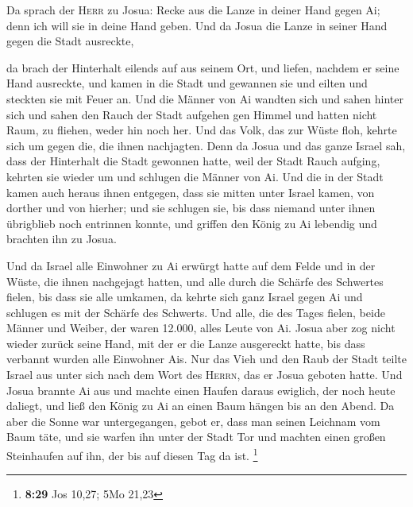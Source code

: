  Da sprach der \textsc{Herr} zu Josua: Recke aus die
Lanze in deiner Hand gegen Ai; denn ich will sie in deine Hand geben.
Und da Josua die Lanze in seiner Hand gegen die Stadt ausreckte,

 da brach der Hinterhalt eilends auf aus seinem Ort, und
liefen, nachdem er seine Hand ausreckte, und kamen in die Stadt und
gewannen sie und eilten und steckten sie mit Feuer an. 
Und die Männer von Ai wandten sich und sahen hinter sich und sahen den
Rauch der Stadt aufgehen gen Himmel und hatten nicht Raum, zu fliehen,
weder hin noch her. Und das Volk, das zur Wüste floh, kehrte sich um
gegen die, die ihnen nachjagten.  Denn da Josua und das
ganze Israel sah, dass der Hinterhalt die Stadt gewonnen hatte, weil der
Stadt Rauch aufging, kehrten sie wieder um und schlugen die Männer von
Ai.  Und die in der Stadt kamen auch heraus ihnen
entgegen, dass sie mitten unter Israel kamen, von dorther und von
hierher; und sie schlugen sie, bis dass niemand unter ihnen übrigblieb
noch entrinnen konnte,  und griffen den König zu Ai
lebendig und brachten ihn zu Josua.

 Und da Israel alle Einwohner zu Ai erwürgt hatte auf dem
Felde und in der Wüste, die ihnen nachgejagt hatten, und alle durch die
Schärfe des Schwertes fielen, bis dass sie alle umkamen, da kehrte sich
ganz Israel gegen Ai und schlugen es mit der Schärfe des Schwerts.
 Und alle, die des Tages fielen, beide Männer und Weiber,
der waren 12.000, alles Leute von Ai.  Josua aber zog
nicht wieder zurück seine Hand, mit der er die Lanze ausgereckt hatte,
bis dass verbannt wurden alle Einwohner Ais.  Nur das
Vieh und den Raub der Stadt teilte Israel aus unter sich nach dem Wort
des \textsc{Herrn}, das er Josua geboten hatte.  Und
Josua brannte Ai aus und machte einen Haufen daraus ewiglich, der noch
heute daliegt,  und ließ den König zu Ai an einen Baum
hängen bis an den Abend. Da aber die Sonne war untergegangen, gebot er,
dass man seinen Leichnam vom Baum täte, und sie warfen ihn unter der
Stadt Tor und machten einen großen Steinhaufen auf ihn, der bis auf
diesen Tag da ist. \footnote{\textbf{8:29} Jos 10,27; 5Mo 21,23}

